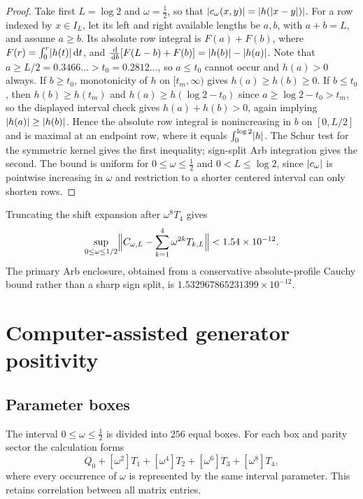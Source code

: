 \documentclass[11pt,a4paper]{article}
\newcommand{\dd}{\,\mathrm d}
\DeclarePairedDelimiter{\abs}{\lvert}{\rvert}
\theoremstyle{plain}
\theoremstyle{definition}
\numberwithin{equation}{section}
\begin{document}
\begin{proof}
Take first $L=\log2$ and $\omega=\tfrac12$, so that $\abs{c_\omega(x,y)}=\abs{h(\abs{x-y})}$.
For a row indexed by $x\in I_L$, let its left and right available lengths be
$a,b$, with $a+b=L$, and assume $a\ge b$. Its absolute row integral is
$F(a)+F(b)$, where $F(r)=\int_0^r\abs{h(t)}\dd t$, and
$\frac{\dd}{\dd b}[F(L-b)+F(b)]=\abs{h(b)}-\abs{h(a)}$. Note that
$a\ge L/2=0.3466\ldots>t_0=0.2812\ldots$, so $a\le t_0$ cannot occur and
$h(a)>0$ always. If $b\ge t_0$, monotonicity of $h$ on $[t_m,\infty)$ gives
$h(a)\ge h(b)\ge0$. If $b\le t_0$, then $h(b)\ge h(t_m)$ and
$h(a)\ge h(\log2-t_0)$ since $a\ge\log2-t_0>t_m$, so the displayed interval
check gives $h(a)+h(b)>0$, again implying $\abs{h(a)}\ge\abs{h(b)}$. Hence the
absolute row integral is nonincreasing in $b$ on $[0,L/2]$ and is maximal at
an endpoint row, where it equals $\int_0^{\log2}\abs h$. The Schur test for
the symmetric kernel gives the first inequality; sign-split Arb integration
gives the second. The bound is uniform for $0\le\omega\le\tfrac12$ and
$0<L\le\log2$, since $\abs{c_\omega}$ is pointwise increasing in $\omega$ and
restriction to a shorter centered interval can only shorten rows.
\end{proof}

Truncating the shift expansion after $\omega^8T_4$ gives
\begin{equation}\label{eq:taylor-remainder}
\sup_{0\le\omega\le1/2}\Bigl\|C_{\omega,L}-\sum_{k=1}^{4}\omega^{2k}T_{k,L}\Bigr\|
<1.54\times10^{-12}.
\end{equation}
The primary Arb enclosure, obtained from a conservative absolute-profile Cauchy
bound rather than a sharp sign split, is $1.532967865231399\times10^{-12}$.

\section{Computer-assisted generator positivity}

\subsection{Parameter boxes}

The interval $0\le\omega\le\tfrac12$ is divided into $256$ equal boxes. For
each box and parity sector the calculation forms
\begin{equation}
Q_0+[\omega^2]T_1+[\omega^4]T_2+[\omega^6]T_3+[\omega^8]T_4,
\end{equation}
where every occurrence of $\omega$ is represented by the same interval
parameter. This retains correlation between all matrix entries.
\end{document}
